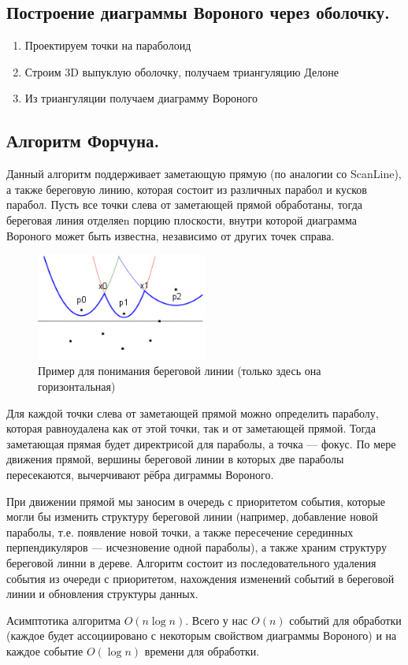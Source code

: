 \subsection{Построение диаграммы Вороного через оболочку.}
\begin{enumerate}
  \item Проектируем точки на параболоид
  \item Строим 3D выпуклую оболочку, получаем триангуляцию Делоне
  \item Из триангуляции получаем диаграмму Вороного
\end{enumerate}

\subsection{Алгоритм Форчуна.}

Данный алгоритм поддерживает заметающую прямую (по аналогии со ScanLine), а также береговую линию, которая
состоит из различных парабол и кусков парабол. Пусть все точки слева от заметающей прямой обработаны, 
тогда береговая линия отделяеn порцию плоскости, внутри которой диаграмма Вороного может быть известна,
независимо от других точек справа.

\begin{figure}[H]    
  \centering    
  \includegraphics[width=0.5\textwidth]{figures/forchExample.png}    
  \caption*{Пример для понимания береговой линии (только здесь она горизонтальная)}        
\end{figure} 

Для каждой точки слева от заметающей прямой можно определить параболу, которая равноудалена как от этой
точки, так и от заметающей прямой. Тогда заметающая прямая будет директрисой для параболы, а точка --- 
фокус. По мере движения прямой, вершины береговой линии в которых две параболы пересекаются, вычерчивают
рёбра диграммы Вороного. 

При движении прямой мы заносим в очередь с приоритетом события, которые могли бы изменить структуру
береговой линии (например, добавление новой параболы, т.е. появление новой точки, а также пересечение
серединных перпендикуляров --- исчезновение одной параболы), а также храним структуру береговой линни
в дереве. Алгоритм состоит из последовательного удаления события из очереди с приоритетом, нахождения
изменений событий в береговой линии и обновления структуры данных.

\begin{remark}
  Асимптотика алгоритма $O(n \log n)$. Всего у нас $O(n)$ событий для обработки (каждое будет ассоциировано
  с некоторым свойством диаграммы Вороного) и на каждое событие $O(\log n)$ времени для обработки.
\end{remark}

